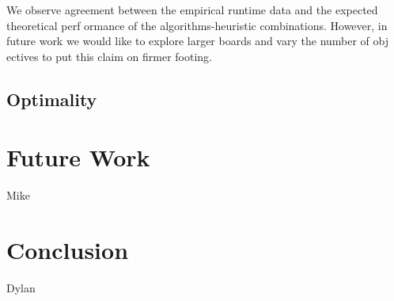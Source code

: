 \documentclass[12pt, conference, compsocconf]{IEEEtran}
\begin{document}
We observe agreement between the empirical runtime data and the expected theoretical perf
ormance of the algorithms-heuristic combinations.
However, in future work we would like to explore larger boards and vary the number of obj
ectives to put this claim on firmer footing.


\subsection{Optimality}


\section{Future Work}
Mike

\section{Conclusion}
Dylan



\end{document}
